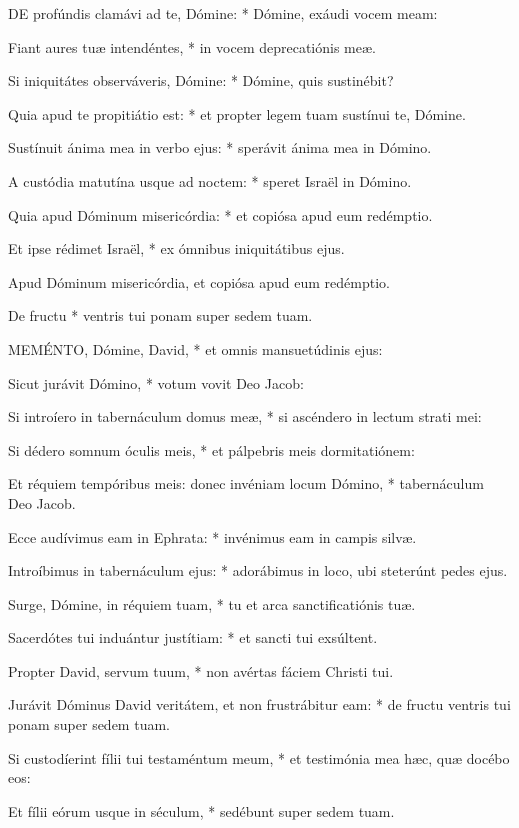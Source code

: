
\lettrine[lines=2]{D}{E} profúndis clamávi ad te, Dómine: * Dómine, exáudi vocem meam:

Fiant aures tuæ intendéntes, * in vocem deprecatiónis meæ.

Si iniquitátes observáveris, Dómine: * Dómine, quis sustinébit?

Quia apud te propitiátio est: * et propter legem tuam sustínui te, Dómine.

Sustínuit ánima mea in verbo ejus: * sperávit ánima mea in Dómino.

A custódia matutína usque ad noctem: * speret Israël in Dómino.

Quia apud Dóminum misericórdia: * et copiósa apud eum redémptio.

Et ipse rédimet Israël, * ex ómnibus iniquitátibus ejus.

 Apud Dóminum misericórdia, et copiósa apud eum redémptio.

 De fructu * ventris tui ponam super sedem tuam.


\lettrine[lines=2]{M}{EMÉNTO}, Dómine, David, * et omnis mansuetúdinis ejus:

Sicut jurávit Dómino, * votum vovit Deo Jacob:

Si introíero in tabernáculum domus meæ, * si ascéndero in lectum strati mei:

Si dédero somnum óculis meis, * et pálpebris meis dormitatiónem:

Et réquiem tempóribus meis: donec invéniam locum Dómino, * tabernáculum Deo Jacob.

Ecce audívimus eam in Ephrata: * invénimus eam in campis silvæ.

Introíbimus in tabernáculum ejus: * adorábimus in loco, ubi steterúnt pedes ejus.

Surge, Dómine, in réquiem tuam, * tu et arca sanctificatiónis tuæ.

Sacerdótes tui induántur justítiam: * et sancti tui exsúltent.

Propter David, servum tuum, * non avértas fáciem Christi tui.

Jurávit Dóminus David veritátem, et non frustrábitur eam: * de fructu ventris tui ponam super sedem tuam.

Si custodíerint fílii tui testaméntum meum, * et testimónia mea hæc, quæ docébo eos:

Et fílii eórum usque in séculum, * sedébunt super sedem tuam.

